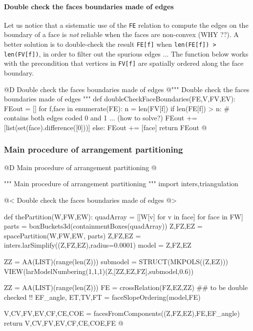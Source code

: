 \documentclass[11pt,oneside]{article}    %
\begin{document}
\paragraph{Double check the faces boundaries made of edges}
Let us notice that a sistematic use of the \texttt{FE} relation to compute the edges on the boundary of a face is \emph{not} reliable when the faces are non-convex (WHY ??). A better solution is to double-check the result \texttt{FE[f]} when \texttt{len(FE[f]) > len(FV[f])}, in order to filter out the spurious edges ...
The function below works with the precondition that vertices in \texttt{FV[f]} are spatially ordered along the face boundary.

@D Double check the faces boundaries made of edges
@{""" Double check the faces boundaries made of edges """
def doubleCheckFaceBoundaries(FE,V,FV,EV):
    FEout = []
    for f,face in enumerate(FE):
        n = len(FV[f])
        if len(FE[f]) > n:
            # contains both edges coded 0 and 1 ... (how to solve?)
            FEout += [list(set(face).difference([0]))]
        else:
            FEout += [face]
    return FEout
@}


\subsubsection{Main procedure of arrangement partitioning}

@D Main procedure of arrangement partitioning
@{""" Main procedure of arrangement partitioning """
import inters,triangulation

@< Double check the faces boundaries made of edges @>

def thePartition(W,FW,EW):
    quadArray = [[W[v] for v in face] for face in FW]
    parts = boxBuckets3d(containmentBoxes(quadArray))
    Z,FZ,EZ = spacePartition(W,FW,EW, parts)
    Z,FZ,EZ = inters.larSimplify((Z,FZ,EZ),radius=0.0001)
    model = Z,FZ,EZ

    ZZ = AA(LIST)(range(len(Z)))
    submodel = STRUCT(MKPOLS((Z,EZ)))
    VIEW(larModelNumbering(1,1,1)(Z,[ZZ,EZ,FZ],submodel,0.6)) 

    ZZ = AA(LIST)(range(len(Z)))
    FE = crossRelation(FZ,EZ,ZZ) ## to be double checked !!
    EF_angle, ET,TV,FT = faceSlopeOrdering(model,FE)
    
    V,CV,FV,EV,CF,CE,COE = facesFromComponents((Z,FZ,EZ),FE,EF_angle)
    return V,CV,FV,EV,CF,CE,COE,FE
@}
\end{document}
